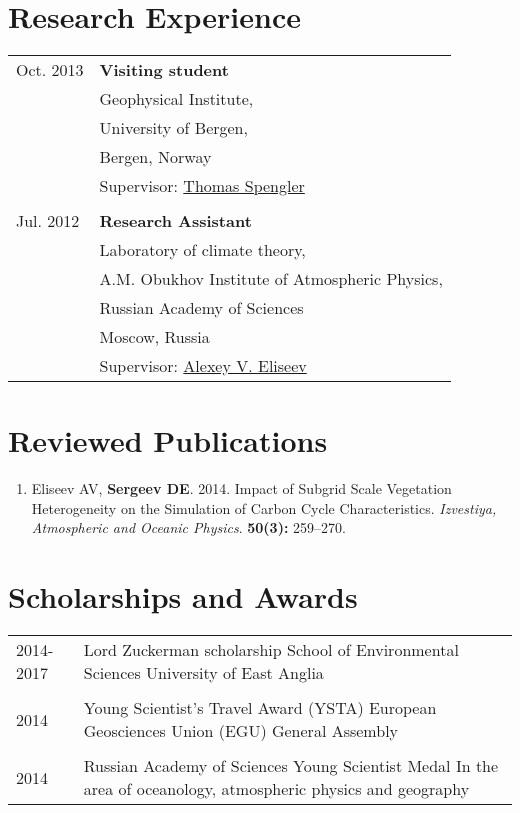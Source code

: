 \documentclass[a4paper,10pt]{article}
\makeatletter
\newlength{\mycol}
\newlength{\bibhang}
\newlength{\bibsep}
 {\@listi \global\bibsep\itemsep \global\advance\bibsep by\parsep}
\newenvironment{bibsection}%
        {\begin{enumerate}{}{%
       \setlength{\leftmargin}{\bibhang}%
       \setlength{\itemindent}{-\leftmargin}%
       \setlength{\itemsep}{\bibsep}%
       \setlength{\parsep}{\z@}%
        \setlength{\partopsep}{0pt}%
        \setlength{\topsep}{0pt}}}
        {\end{enumerate}\vspace{-.6\baselineskip}}
\makeatother
\begin{document}
\section{Research Experience}
\begin{tabu} to 
 {\small Oct.} 2013 & \textbf{Visiting student} \\
& Geophysical Institute, \\
& University of Bergen, \\
& Bergen, Norway \\
& Supervisor: \href{mailto:thomas.spengler@gfi.uib.no}{Thomas Spengler}\\
 \\
{\small Jul.} 2012 & \textbf{Research Assistant} \\
& Laboratory of climate theory, \\
& A.M. Obukhov Institute of Atmospheric Physics, \\
& Russian Academy of Sciences \\
& Moscow, Russia \\
& Supervisor: \href{mailto:eliseev@ifaran.ru}{Alexey V. Eliseev}\\
\end{tabu}

\section{Reviewed Publications}
\begin{bibsection}
    \item Eliseev AV, {\bf Sergeev DE}. 2014. Impact of Subgrid Scale Vegetation Heterogeneity on the Simulation of Carbon Cycle Characteristics. \emph{Izvestiya, Atmospheric and Oceanic Physics}. \textbf{50(3):} 259--270.
\end{bibsection}

      
\section{Scholarships and Awards}
\begin{tabu} to 	
 \textsc{2014-2017} & Lord Zuckerman scholarship
                    \newline School of Environmental Sciences
                    \newline University of East Anglia \\
  \\
 \textsc{2014} & Young Scientist's Travel Award (YSTA)
                 \newline European Geosciences Union (EGU) General Assembly \\
  \\
 \textsc{2014} & Russian Academy of Sciences Young Scientist Medal
                 \newline In the area of oceanology, atmospheric physics and geography
\end{tabu}
\end{document}
